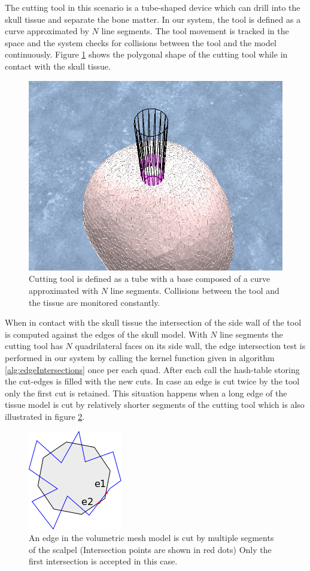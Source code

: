 The cutting tool in this scenario is a tube-shaped device which can drill into the skull tissue and separate the bone matter.
In our system, the tool is defined as a curve approximated by $N$ line segments. The tool movement is tracked in the space 
and the system checks for collisions between the tool and the model continuously. Figure \ref{fig:craniotomytube} shows the 
polygonal shape of the cutting tool while in contact with the skull tissue.

\begin{figure}[H]
  \centering
  \includegraphics[width=0.6\linewidth]{figures/evaluation/craniotomytube.png}
  \caption{\label{fig:craniotomytube}
  {Cutting tool is defined as a tube with a base composed of a curve approximated with $N$ line segments. 
  Collisions between the tool and the tissue are monitored constantly.}
}
\end{figure}

When in contact with the skull tissue the intersection of the side wall of the tool is computed against the edges of the 
skull model. With $N$ line segments the cutting tool has $N$ quadrilateral faces on its side wall, the edge intersection 
test is performed in our system by calling the kernel function given in algorithm \ref{alg:edgeIntersections} once per each quad.
After each call the hash-table storing the cut-edges is filled with the new cuts. In case an edge is cut twice by the tool only 
the first cut is retained. This situation happens when a long edge of the tissue model is cut by relatively shorter segments of 
the cutting tool which is also illustrated in figure \ref{fig:ringscalpalissue}.

\begin{figure}[H]
  \centering
  \includegraphics[width=0.2\linewidth]{figures/evaluation/ringscalpalissue.png}
  \caption{\label{fig:ringscalpalissue}
  {An edge in the volumetric mesh model is cut by multiple segments of the scalpel (Intersection points are shown in red dots)
   Only the first intersection is accepted in this case.}
}
\end{figure}


